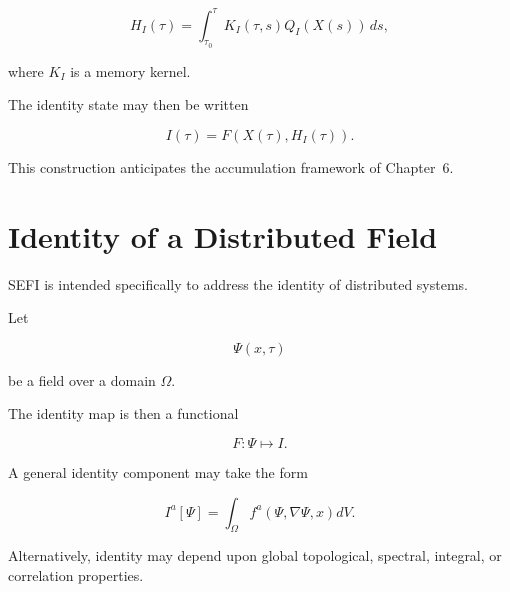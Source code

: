 \documentclass[12pt,oneside]{book}
\begin{document}
\begin{equation}
    H_I(\tau)
    =
    \int_{\tau_0}^{\tau}
        K_I(\tau,s)
        Q_I(X(s))
    \,ds,
    \label{eq:identity-memory-integral}
\end{equation}

where \(K_I\) is a memory kernel.

The identity state may then be written

\begin{equation}
    I(\tau)
    =
    F
    \left(
        X(\tau),
        H_I(\tau)
    \right).
    \label{eq:identity-with-memory}
\end{equation}

This construction anticipates the accumulation framework of
Chapter~6.


\section{Identity of a Distributed Field}
\label{sec:distributed-identity}

SEFI is intended specifically to address the identity of
distributed systems.

Let

\begin{equation}
    \Psi(x,\tau)
\end{equation}

be a field over a domain \(\Omega\).

The identity map is then a functional

\begin{equation}
    F:
    \Psi
    \longmapsto
    I.
    \label{eq:field-identity-functional}
\end{equation}

A general identity component may take the form

\begin{equation}
    I^a[\Psi]
    =
    \int_{\Omega}
        f^a
        \left(
            \Psi,
            \nabla\Psi,
            x
        \right)
    dV.
    \label{eq:distributed-identity-functional}
\end{equation}

Alternatively, identity may depend upon global topological,
spectral, integral, or correlation properties.
\end{document}
